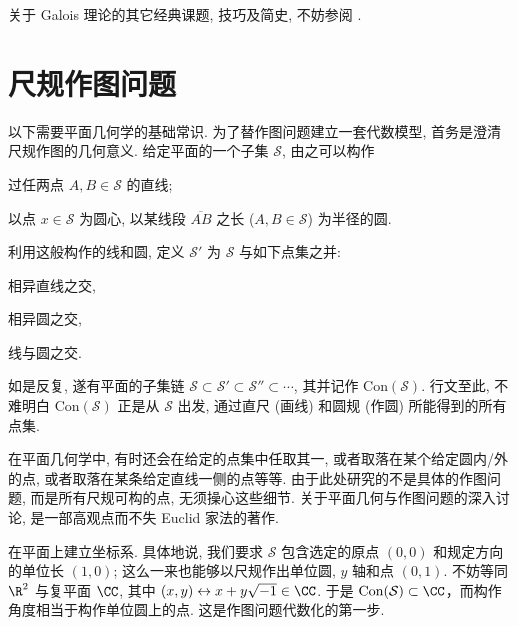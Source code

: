 关于 Galois 理论的其它经典课题, 技巧及简史, 不妨参阅 \cite{ZhP}.

\section{尺规作图问题}
以下需要平面几何学的基础常识. 为了替作图问题建立一套代数模型, 首务是澄清尺规作图的几何意义. 给定平面的一个子集 $\mathcal{S}$, 由之可以构作
\begin{compactitem}
	\item 过任两点 $A, B \in \mathcal{S}$ 的直线;
	\item 以点 $x \in \mathcal{S}$ 为圆心, 以某线段 $\overline{AB}$ 之长 ($A,B \in \mathcal{S}$) 为半径的圆.
\end{compactitem}
利用这般构作的线和圆, 定义 $\mathcal{S}'$ 为 $\mathcal{S}$ 与如下点集之并:
\begin{compactitem}
	\item 相异直线之交,
	\item 相异圆之交,
	\item 线与圆之交.
\end{compactitem}
如是反复, 遂有平面的子集链 $\mathcal{S} \subset \mathcal{S}' \subset \mathcal{S}'' \subset \cdots$, 其并记作 $\text{Con}(\mathcal{S})$. 行文至此, 不难明白 $\text{Con}(\mathcal{S})$ 正是从 $\mathcal{S}$ 出发, 通过直尺 (画线) 和圆规 (作圆) 所能得到的所有点集. 

在平面几何学中, 有时还会在给定的点集中任取其一, 或者取落在某个给定圆内/外的点, 或者取落在某条给定直线一侧的点等等. 由于此处研究的不是具体的作图问题, 而是所有尺规可构的点, 无须操心这些细节. 关于平面几何与作图问题的深入讨论, \cite{Har00} 是一部高观点而不失 Euclid 家法的著作.

在平面上建立坐标系. 具体地说, 我们要求 $\mathcal{S}$ 包含选定的原点 $(0,0)$ 和规定方向的单位长 $(1,0)$; 这么一来也能够以尺规作出单位圆, $y$ 轴和点 $(0,1)$. 不妨等同 $\R^2$ 与复平面 $\CC$, 其中 $(x,y) \leftrightarrow x + y\sqrt{-1} \in \CC$. 于是 $\text{Con}(\mathcal{S}) \subset \CC$，而构作角度相当于构作单位圆上的点. 这是作图问题代数化的第一步. 


